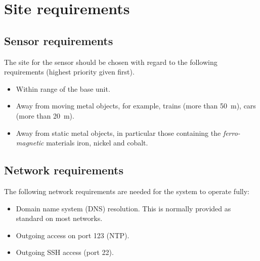 \chapter{Site requirements}

\section{Sensor requirements}
The site for the sensor should be chosen with regard to the following
requirements (highest priority given first).

\begin{itemize}
\item Within range of the base unit.
\item Away from moving metal objects, for example, trains (more than
  \SI{50}{\metre}), cars (more than \SI{20}{\metre}).
\item Away from static metal objects, in particular those containing
  the \emph{ferro-magnetic} materials iron, nickel and cobalt.
\end{itemize}

\section{Network requirements}

The following network requirements are needed for the system to
operate fully:
\begin{itemize}
\item Domain name system (DNS) resolution. This is normally provided
  as standard on most networks.
\item Outgoing access on port 123 (NTP).
\item Outgoing SSH access (port 22).
\end{itemize}





